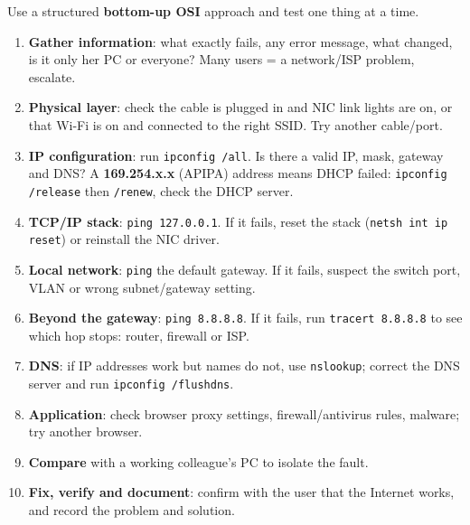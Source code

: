 \documentclass[10pt]{article}
\begin{document}
\begin{ans}
Use a structured \textbf{bottom-up OSI} approach and test one thing at a time.
\begin{enumerate}
\item \textbf{Gather information}: what exactly fails, any error message, what changed, is it only her PC or everyone? Many users = a network/ISP problem, escalate.
\item \textbf{Physical layer}: check the cable is plugged in and NIC link lights are on, or that Wi-Fi is on and connected to the right SSID. Try another cable/port.
\item \textbf{IP configuration}: run \texttt{ipconfig /all}. Is there a valid IP, mask, gateway and DNS? A \textbf{169.254.x.x} (APIPA) address means DHCP failed: \texttt{ipconfig /release} then \texttt{/renew}, check the DHCP server.
\item \textbf{TCP/IP stack}: \texttt{ping 127.0.0.1}. If it fails, reset the stack (\texttt{netsh int ip reset}) or reinstall the NIC driver.
\item \textbf{Local network}: \texttt{ping} the default gateway. If it fails, suspect the switch port, VLAN or wrong subnet/gateway setting.
\item \textbf{Beyond the gateway}: \texttt{ping 8.8.8.8}. If it fails, run \texttt{tracert 8.8.8.8} to see which hop stops: router, firewall or ISP.
\item \textbf{DNS}: if IP addresses work but names do not, use \texttt{nslookup}; correct the DNS server and run \texttt{ipconfig /flushdns}.
\item \textbf{Application}: check browser proxy settings, firewall/antivirus rules, malware; try another browser.
\item \textbf{Compare} with a working colleague's PC to isolate the fault.
\item \textbf{Fix, verify and document}: confirm with the user that the Internet works, and record the problem and solution.
\end{enumerate}
\end{ans}
\end{document}
